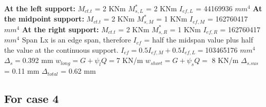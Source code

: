 \documentclass{article}%
\begin{document}
%
\newline%
\newline%
%
\textbf{At the left support:}%
\newline%
\newline%
%
$M_{ct.t}$ = 2 KNm%
\newline%
%
$M_{s,L}^{*}$ = 2 KNm%
\newline%
%
$I_{ef,L}$ = 44169936 $mm^{4}$%
\newline%
\newline%
%
\textbf{At the midpoint support:}%
\newline%
\newline%
%
$M_{ct.t}$ = 2 KNm%
\newline%
%
$M_{s,M}^{*}$ = 1 KNm%
\newline%
%
$I_{ef,M}$ = 162760417 $mm^{4}$%
\newline%
\newline%
%
\textbf{At the right support:}%
\newline%
\newline%
%
$M_{ct.t}$ = 2 KNm%
\newline%
%
$M_{s,R}^{*}$ = 1 KNm%
\newline%
%
$I_{ef,R}$ = 162760417 $mm^{4}$%
\newline%
\newline%
%
Span Lx is an edge span, therefore $I_{ef}$ = half the midspan value plus half the value at the continuous support.%
\newline%
\newline%
%
$I_{ef} = 0.5I_{ef,M} + 0.5I_{ef,L} = $103465176 $ mm^{4}$%
\newline%
\newline%
%
$\Delta_{s} =$0.392 mm%
\newline%
\newline%
%
$w_{long} = G + \psi_{l}Q = $7 KN/m%
\newline%
%
$w_{short} = G + \psi_{s}Q = $ 8 KN/m%
\newline%
\newline%
%
$\Delta_{s.sus}$ = 0.11 mm%
\newline%
\newline%
%
$\Delta_{total}$ = 0.62 mm%
\subsection*{For case 4}%
\label{subsec:Forcase4}%
\end{document}
